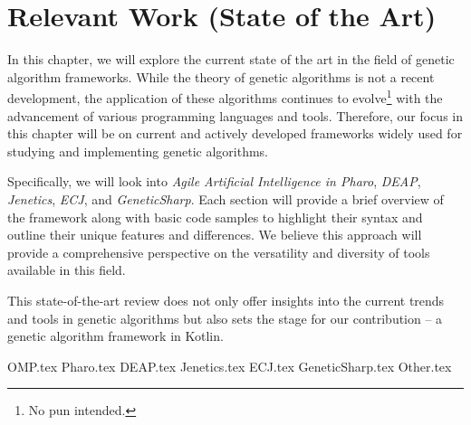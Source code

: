 \chapter{Relevant Work (State of the Art)}
\label{chap:sota}

  In this chapter, we will explore the current state of the art in the field of
  genetic algorithm frameworks.
  While the theory of genetic algorithms is not a recent development, the
  application of these algorithms continues to evolve\footnote{No pun intended.}
  with the advancement of various programming languages and tools.
  Therefore, our focus in this chapter will be on current and actively developed
  frameworks widely used for studying and implementing genetic algorithms.

  Specifically, we will look into \emph{Agile Artificial Intelligence in Pharo},
  \emph{DEAP}, \emph{Jenetics}, \emph{ECJ}, and \emph{GeneticSharp}.
  Each section will provide a brief overview of the framework along with basic
  code samples to highlight their syntax and outline their unique features and
  differences.
  We believe this approach will provide a comprehensive perspective on the
  versatility and diversity of tools available in this field.

  This state-of-the-art review does not only offer insights into the current
  trends and tools in genetic algorithms but also sets the stage for our
  contribution -- a genetic algorithm framework in Kotlin.

  {OMP.tex}
  {Pharo.tex}
  {DEAP.tex}
  {Jenetics.tex}
  {ECJ.tex}
  {GeneticSharp.tex}
  {Other.tex}
